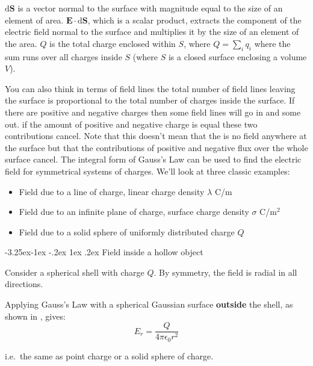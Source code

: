 \documentclass[
]{book}
\makeatletter
\renewcommand\subsection{%
\@startsection{subsection}{2}{\z@}%
              {-3.25ex\@plus -1ex \@minus -.2ex}%
              {1ex \@plus .2ex}%
              {\sffamily\bfseries}}
\numberwithin{equation}{section}
\makeatother
\begin{document}
\(\mathrm{d} \mathbf{S}\) is a vector normal to the surface with magnitude equal to the
size of an element of area. \(\mathbf{E} \cdot \mathrm{d} \mathbf{S}\), which is a scalar product,
extracts the component of the electric field normal to the surface and
multiplies it by the size of an element of the area. \(Q\) is the total
charge enclosed within \(S\), where \(Q = \sum_i q_i\) where the sum runs
over all charges inside \(S\) (where \(S\) is a closed surface enclosing a
volume \(V\)).

You can also think in terms of field lines the total number of field
lines leaving the surface is proportional to the total number of charges
inside the surface. If there are positive and negative charges then some
field lines will go in and some out. if the amount of positive and
negative charge is equal these two contributions cancel. Note that this
doesn't mean that the is no field anywhere at the surface but that the
contributions of positive and negative flux over the whole surface
cancel. The integral form of Gauss's Law can be used to find the
electric field for symmetrical systems of charges. We'll look at three
classic examples:

\begin{itemize}
\item
  Field due to a line of charge, linear charge density \(\lambda\) C/m
\item
  Field due to an infinite plane of charge, surface charge density
  \(\sigma\) C/m\(^2\)
\item
  Field due to a solid sphere of uniformly distributed charge \(Q\)
\end{itemize}

\hypertarget{field-inside-a-hollow-object}{%
\subsection{Field inside a hollow object}\label{field-inside-a-hollow-object}}

Consider a spherical shell with charge \(Q\). By symmetry, the field is
radial in all directions.

Applying Gauss's Law with a spherical Gaussian surface \textbf{outside} the
shell, as shown in , gives:
\begin{equation}
\label{eq:fieldShell}
E_r = \frac{Q}{4\pi\epsilon_0 r^2} 
\end{equation}

i.e.~the same as point charge or a solid sphere of charge.
\end{document}
